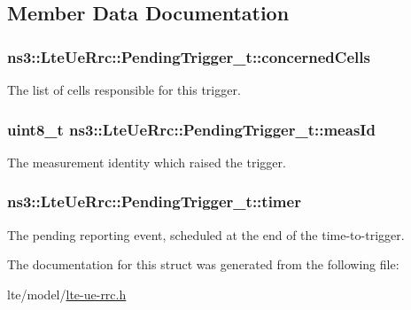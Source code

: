 \subsection{Member Data Documentation}
\subsubsection[{\texorpdfstring{concerned\+Cells}{concernedCells}}]{ ns3\+::\+Lte\+Ue\+Rrc\+::\+Pending\+Trigger\+\_\+t\+::concerned\+Cells}\hypertarget{structns3_1_1LteUeRrc_1_1PendingTrigger__t_a4c34f72ae48feacf85417de09880f43f}{}\label{structns3_1_1LteUeRrc_1_1PendingTrigger__t_a4c34f72ae48feacf85417de09880f43f}


The list of cells responsible for this trigger. 

\subsubsection[{\texorpdfstring{meas\+Id}{measId}}]{\setlength{\rightskip}{0pt plus 5cm}uint8\+\_\+t ns3\+::\+Lte\+Ue\+Rrc\+::\+Pending\+Trigger\+\_\+t\+::meas\+Id}\hypertarget{structns3_1_1LteUeRrc_1_1PendingTrigger__t_a61252cbc490480a84f98ecb4e6515316}{}\label{structns3_1_1LteUeRrc_1_1PendingTrigger__t_a61252cbc490480a84f98ecb4e6515316}


The measurement identity which raised the trigger. 

\subsubsection[{\texorpdfstring{timer}{timer}}]{ ns3\+::\+Lte\+Ue\+Rrc\+::\+Pending\+Trigger\+\_\+t\+::timer}\hypertarget{structns3_1_1LteUeRrc_1_1PendingTrigger__t_a55eec70e8b5d51918bff56d2ca04cbaa}{}\label{structns3_1_1LteUeRrc_1_1PendingTrigger__t_a55eec70e8b5d51918bff56d2ca04cbaa}


The pending reporting event, scheduled at the end of the time-\/to-\/trigger. 



The documentation for this struct was generated from the following file\+:\begin{DoxyCompactItemize}
\item 
lte/model/\hyperlink{lte-ue-rrc_8h}{lte-\/ue-\/rrc.\+h}\end{DoxyCompactItemize}
